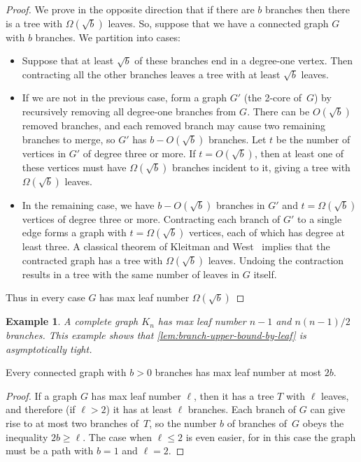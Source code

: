 \documentclass{jgaa-art}
\newtheorem{example}{Example}
\begin{document}
\begin{proof}
We prove in the opposite direction that if there are $b$ branches then there is a tree with $\Omega(\sqrt b)$ leaves.
So, suppose that we have a connected graph $G$ with $b$ branches.
We partition into cases:
\begin{itemize}
\item Suppose that at least $\sqrt b$ of these branches end in a degree-one vertex.
Then contracting all the other branches leaves a tree with at least $\sqrt b$ leaves.
\item If we are not in the previous case, form a graph $G'$ (the 2-core of~$G$) by recursively removing all degree-one branches from $G$. There can be $O(\sqrt b)$ removed branches, and each removed branch may cause two remaining branches to merge, so $G'$ has $b-O(\sqrt b)$ branches. Let $t$ be the number of vertices in $G'$ of degree three or more. If $t=O(\sqrt b)$, then at least one of these vertices must have $\Omega(\sqrt b)$ branches incident to it, giving a tree with $\Omega(\sqrt b)$ leaves.
\item In the remaining case, we have $b-O(\sqrt b)$ branches in $G'$ and $t=\Omega(\sqrt b)$ vertices of degree three or more. Contracting each branch of $G'$ to a single edge forms a graph with $t=\Omega(\sqrt b)$ vertices, each of which has degree at least three. A classical theorem of Kleitman and West~\cite{KleWes-SJDM-91} implies that the contracted graph has a tree with $\Omega(\sqrt b)$ leaves. Undoing the contraction results in a tree with the same number of leaves in $G$ itself.
\end{itemize}
Thus in every case $G$ has max leaf number $\Omega(\sqrt b)$
\end{proof}

\begin{example}
A complete graph $K_n$ has max leaf number $n-1$ and  $n(n-1)/2$ branches. This example shows that \autoref{lem:branch-upper-bound-by-leaf} is asymptotically tight.
\end{example} 

\begin{lemma}
\label{lem:leaf-upper-bound-by-branch}
Every connected graph with $b>0$ branches has max leaf number at most $2b$.
\end{lemma}

\begin{proof}
If a graph $G$ has max leaf number $\ell$, then it has a tree $T$ with $\ell$ leaves, and therefore (if $\ell>2$) it has at least $\ell$ branches. Each branch of $G$ can give rise to at most two branches of~$T$, so the number $b$ of branches of~$G$ obeys the inequality $2b\ge \ell$. The case when $\ell\le 2$ is even easier, for  in this case the graph must be a path with $b=1$ and $\ell=2$.
\end{proof}
\end{document}
